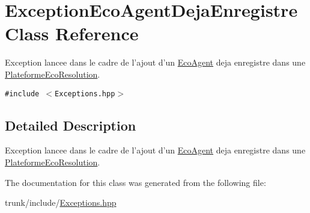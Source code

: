 \hypertarget{classExceptionEcoAgentDejaEnregistre}{
\section{ExceptionEcoAgentDejaEnregistre Class Reference}
\label{classExceptionEcoAgentDejaEnregistre}
}
Exception lancee dans le cadre de l'ajout d'un \hyperlink{classEcoAgent}{EcoAgent} deja enregistre dans une \hyperlink{classPlateformeEcoResolution}{PlateformeEcoResolution}.  


{\tt \#include $<$Exceptions.hpp$>$}



\subsection{Detailed Description}
Exception lancee dans le cadre de l'ajout d'un \hyperlink{classEcoAgent}{EcoAgent} deja enregistre dans une \hyperlink{classPlateformeEcoResolution}{PlateformeEcoResolution}. 

The documentation for this class was generated from the following file:\begin{CompactItemize}
\item 
trunk/include/\hyperlink{Exceptions_8hpp}{Exceptions.hpp}\end{CompactItemize}
